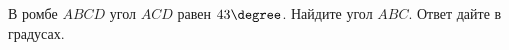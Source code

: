 \begin{ex}
	\begin{condition}
		В ромбе \( ABCD \) угол \( ACD \) равен \( 43\degree \). Найдите угол \( ABC \). Ответ дайте в градусах.
	\end{condition}
\end{ex}